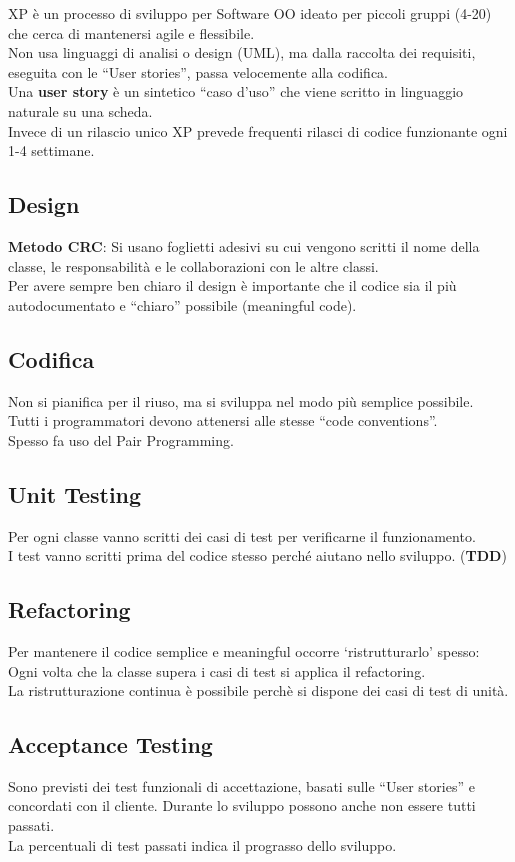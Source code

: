 XP è un processo di sviluppo per Software OO ideato per piccoli gruppi (4-20) che cerca di mantenersi agile e flessibile.\\
Non usa linguaggi di analisi o design (UML), ma dalla raccolta dei requisiti, eseguita con le “User stories”, passa velocemente alla codifica.\\
Una \textbf{user story} è un sintetico “caso d’uso” che viene scritto in linguaggio naturale su una scheda.\\
Invece di un rilascio unico XP prevede frequenti rilasci di codice funzionante ogni 1-4 settimane.

\subsection{Design}
\textbf{Metodo CRC}: Si usano foglietti adesivi su cui vengono scritti il nome della classe, le responsabilità e le collaborazioni con le altre classi.\\
Per avere sempre ben chiaro il design è importante che il codice sia il più autodocumentato e “chiaro” possibile (meaningful code).

\subsection{Codifica}
Non si pianifica per il riuso, ma si sviluppa nel modo più semplice possibile.\\
Tutti i programmatori devono attenersi alle stesse “code conventions”.\\
Spesso fa uso del Pair Programming.

\subsection{Unit Testing}
Per ogni classe vanno scritti dei casi di test per verificarne il funzionamento.\\
I test vanno scritti prima del codice stesso perché aiutano nello sviluppo. (\textbf{TDD})

\subsection{Refactoring}
Per mantenere il codice semplice e meaningful occorre ‘ristrutturarlo’ spesso: Ogni volta che la classe supera i casi di test si applica il refactoring.\\
La ristrutturazione continua è possibile perchè si dispone dei casi di test di unità.

\subsection{Acceptance Testing}
Sono previsti dei test funzionali di accettazione, basati sulle “User stories” e concordati con il cliente. Durante lo sviluppo possono anche non essere tutti passati.\\
La percentuali di test passati indica il prograsso dello sviluppo.